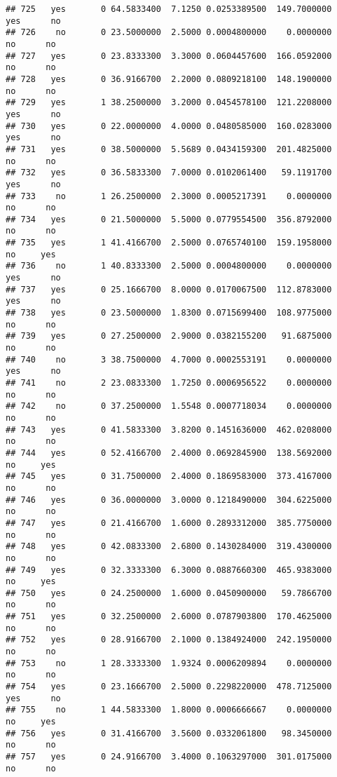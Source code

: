 \documentclass[]{article}
\begin{document}
\begin{verbatim}
## 725   yes       0 64.5833400  7.1250 0.0253389500  149.7000000   yes      no
## 726    no       0 23.5000000  2.5000 0.0004800000    0.0000000    no      no
## 727   yes       0 23.8333300  3.3000 0.0604457600  166.0592000    no      no
## 728   yes       0 36.9166700  2.2000 0.0809218100  148.1900000    no      no
## 729   yes       1 38.2500000  3.2000 0.0454578100  121.2208000   yes      no
## 730   yes       0 22.0000000  4.0000 0.0480585000  160.0283000   yes      no
## 731   yes       0 38.5000000  5.5689 0.0434159300  201.4825000    no      no
## 732   yes       0 36.5833300  7.0000 0.0102061400   59.1191700   yes      no
## 733    no       1 26.2500000  2.3000 0.0005217391    0.0000000    no      no
## 734   yes       0 21.5000000  5.5000 0.0779554500  356.8792000    no      no
## 735   yes       1 41.4166700  2.5000 0.0765740100  159.1958000    no     yes
## 736    no       1 40.8333300  2.5000 0.0004800000    0.0000000   yes      no
## 737   yes       0 25.1666700  8.0000 0.0170067500  112.8783000   yes      no
## 738   yes       0 23.5000000  1.8300 0.0715699400  108.9775000    no      no
## 739   yes       0 27.2500000  2.9000 0.0382155200   91.6875000    no      no
## 740    no       3 38.7500000  4.7000 0.0002553191    0.0000000   yes      no
## 741    no       2 23.0833300  1.7250 0.0006956522    0.0000000    no      no
## 742    no       0 37.2500000  1.5548 0.0007718034    0.0000000    no      no
## 743   yes       0 41.5833300  3.8200 0.1451636000  462.0208000    no      no
## 744   yes       0 52.4166700  2.4000 0.0692845900  138.5692000    no     yes
## 745   yes       0 31.7500000  2.4000 0.1869583000  373.4167000    no      no
## 746   yes       0 36.0000000  3.0000 0.1218490000  304.6225000    no      no
## 747   yes       0 21.4166700  1.6000 0.2893312000  385.7750000    no      no
## 748   yes       0 42.0833300  2.6800 0.1430284000  319.4300000    no      no
## 749   yes       0 32.3333300  6.3000 0.0887660300  465.9383000    no     yes
## 750   yes       0 24.2500000  1.6000 0.0450900000   59.7866700    no      no
## 751   yes       0 32.2500000  2.6000 0.0787903800  170.4625000    no      no
## 752   yes       0 28.9166700  2.1000 0.1384924000  242.1950000    no      no
## 753    no       1 28.3333300  1.9324 0.0006209894    0.0000000    no      no
## 754   yes       0 23.1666700  2.5000 0.2298220000  478.7125000   yes      no
## 755    no       1 44.5833300  1.8000 0.0006666667    0.0000000    no     yes
## 756   yes       0 31.4166700  3.5600 0.0332061800   98.3450000    no      no
## 757   yes       0 24.9166700  3.4000 0.1063297000  301.0175000    no      no

\end{verbatim}
\end{document}
